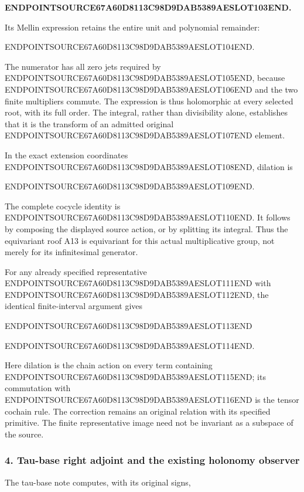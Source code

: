 \textbf{ENDPOINTSOURCE67A60D8113C98D9DAB5389AESLOT103END.}

Its Mellin expression retains the entire unit and polynomial remainder:

ENDPOINTSOURCE67A60D8113C98D9DAB5389AESLOT104END.

The numerator has all zero jets required by ENDPOINTSOURCE67A60D8113C98D9DAB5389AESLOT105END, because ENDPOINTSOURCE67A60D8113C98D9DAB5389AESLOT106END and the two finite multipliers commute. The expression is thus holomorphic at every selected root, with its full order. The integral, rather than divisibility alone, establishes that it is the transform of an admitted original ENDPOINTSOURCE67A60D8113C98D9DAB5389AESLOT107END element.

In the exact extension coordinates ENDPOINTSOURCE67A60D8113C98D9DAB5389AESLOT108END, dilation is

ENDPOINTSOURCE67A60D8113C98D9DAB5389AESLOT109END.

The complete cocycle identity is ENDPOINTSOURCE67A60D8113C98D9DAB5389AESLOT110END. It follows by composing the displayed source action, or by splitting its integral. Thus the equivariant roof A13 is equivariant for this actual multiplicative group, not merely for its infinitesimal generator.

For any already specified representative ENDPOINTSOURCE67A60D8113C98D9DAB5389AESLOT111END with ENDPOINTSOURCE67A60D8113C98D9DAB5389AESLOT112END, the identical finite-interval argument gives

ENDPOINTSOURCE67A60D8113C98D9DAB5389AESLOT113END

ENDPOINTSOURCE67A60D8113C98D9DAB5389AESLOT114END.

Here dilation is the chain action on every term containing ENDPOINTSOURCE67A60D8113C98D9DAB5389AESLOT115END; its commutation with ENDPOINTSOURCE67A60D8113C98D9DAB5389AESLOT116END is the tensor cochain rule. The correction remains an original relation with its specified primitive. The finite representative image need not be invariant as a subspace of the source.

\subsubsection{4. Tau-base right adjoint and the existing holonomy observer}\label{endpoint-f1_scaling--tau-base-right-adjoint-and-the-existing-holonomy-observer}

The tau-base note computes, with its original signs,

